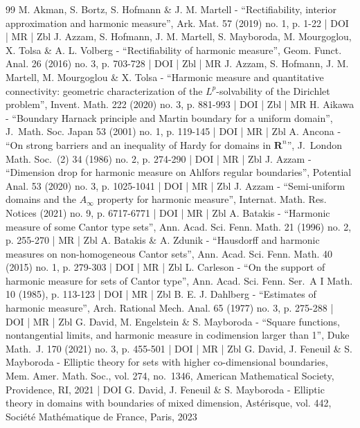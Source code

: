 \begin{thebibliography}{99}
M. Akman, S. Bortz, S. Hofmann \& J. M. Martell - “Rectifiability, interior approximation and harmonic measure”, Ark. Mat. 57 (2019) no. 1, p. 1-22 | DOI | MR | Zbl
J. Azzam, S. Hofmann, J. M. Martell, S. Mayboroda, M. Mourgoglou, X. Tolsa \& A. L. Volberg - “Rectifiability of harmonic measure”, Geom. Funct. Anal. 26 (2016) no. 3, p. 703-728 | DOI | Zbl | MR
J. Azzam, S. Hofmann, J. M. Martell, M. Mourgoglou \& X. Tolsa - “Harmonic measure and quantitative connectivity: geometric characterization of the $L^p$-solvability of the Dirichlet problem”, Invent. Math. 222 (2020) no. 3, p. 881-993 | DOI | Zbl | MR
H. Aikawa - “Boundary Harnack principle and Martin boundary for a uniform domain”, J. Math. Soc. Japan 53 (2001) no. 1, p. 119-145 | DOI | MR | Zbl
A. Ancona - “On strong barriers and an inequality of Hardy for domains in ${\mathbf{R}}^n$”, J. London Math. Soc. (2) 34 (1986) no. 2, p. 274-290 | DOI | MR | Zbl
J. Azzam - “Dimension drop for harmonic measure on Ahlfors regular boundaries”, Potential Anal. 53 (2020) no. 3, p. 1025-1041 | DOI | MR | Zbl
J. Azzam - “Semi-uniform domains and the $A_\infty $ property for harmonic measure”, Internat. Math. Res. Notices (2021) no. 9, p. 6717-6771 | DOI | MR | Zbl
A. Batakis - “Harmonic measure of some Cantor type sets”, Ann. Acad. Sci. Fenn. Math. 21 (1996) no. 2, p. 255-270 | MR | Zbl
A. Batakis \& A. Zdunik - “Hausdorff and harmonic measures on non-homogeneous Cantor sets”, Ann. Acad. Sci. Fenn. Math. 40 (2015) no. 1, p. 279-303 | DOI | MR | Zbl
L. Carleson - “On the support of harmonic measure for sets of Cantor type”, Ann. Acad. Sci. Fenn. Ser. A I Math. 10 (1985), p. 113-123 | DOI | MR | Zbl
B. E. J. Dahlberg - “Estimates of harmonic measure”, Arch. Rational Mech. Anal. 65 (1977) no. 3, p. 275-288 | DOI | MR | Zbl
G. David, M. Engelstein \& S. Mayboroda - “Square functions, nontangential limits, and harmonic measure in codimension larger than 1”, Duke Math. J. 170 (2021) no. 3, p. 455-501 | DOI | MR | Zbl
G. David, J. Feneuil \& S. Mayboroda - Elliptic theory for sets with higher co-dimensional boundaries, Mem. Amer. Math. Soc., vol. 274, no. 1346, American Mathematical Society, Providence, RI, 2021 | DOI
G. David, J. Feneuil \& S. Mayboroda - Elliptic theory in domains with boundaries of mixed dimension, Astérisque, vol. 442, Société Mathématique de France, Paris, 2023

\end{thebibliography}
